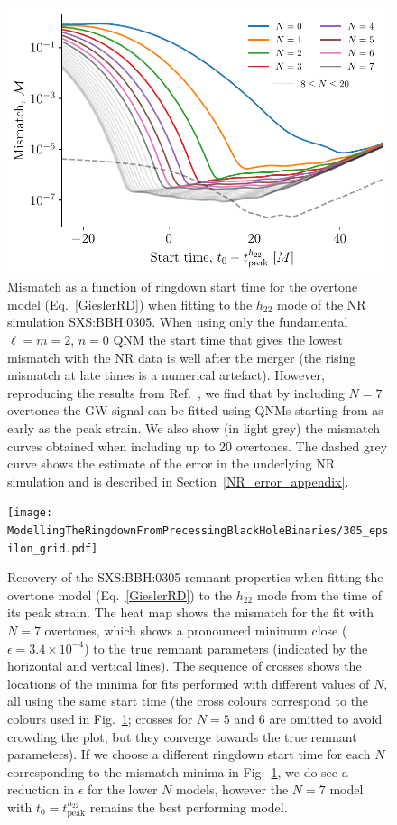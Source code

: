 \begin{figure}[t]
    \centering
    \includegraphics[width=0.6\columnwidth]{Figures/ModellingTheRingdownFromPrecessingBlackHoleBinaries/305_mismatch_vs_t0_updated.pdf}
    \caption[Mismatch of the overtone model fitted to SXS:BBH:0305]{ 
    Mismatch as a function of ringdown start time for the overtone model (Eq.~\ref{GieslerRD}) when fitting to the $h_{22}$ mode of the NR simulation SXS:BBH:0305. 
    When using only the fundamental $\ell = m = 2$, $n = 0$ QNM the start time that gives the lowest mismatch with the NR data is well after the merger (the rising mismatch at late times is a numerical artefact). 
    However, reproducing the results from Ref.~\cite{Giesler:2019uxc}, we find that by including $N=7$ overtones the GW signal can be fitted using QNMs starting from as early as the peak strain. 
    We also show (in light grey) the mismatch curves obtained when including up to 20 overtones.
    The dashed grey curve shows the estimate of the error in the underlying NR simulation and is described in Section~\ref{NR_error_appendix}.
    }
    \label{305_mismatch_vs_t0}
\end{figure}

\begin{figure}[t]
    \centering
    \texttt{[image: ModellingTheRingdownFromPrecessingBlackHoleBinaries/305\_epsilon\_grid.pdf]}
    \caption[Recovery of SXS:BBH:0305 remnant properties using the overtone model]{ 
    Recovery of the SXS:BBH:0305 remnant properties when fitting the overtone model (Eq.~\ref{GieslerRD}) to the $h_{22}$ mode from the time of its peak strain.
    The heat map shows the mismatch for the fit with $N=7$ overtones, which shows a pronounced minimum close ($\epsilon=3.4\times 10^{-4}$) to the true remnant parameters (indicated by the horizontal and vertical lines).
    The sequence of crosses shows the locations of the minima for fits performed with different values of $N$, all using the same start time (the cross colours correspond to the colours used in Fig.~\ref{305_mismatch_vs_t0}; crosses for $N=5$ and 6 are omitted to avoid crowding the plot, but they converge towards the true remnant parameters). 
    If we choose a different ringdown start time for each $N$ corresponding to the mismatch minima in Fig.~\ref{305_mismatch_vs_t0}, we do see a reduction in $\epsilon$ for the lower $N$ models, however the $N=7$ model with $t_0=t_\mathrm{peak}^{h_{22}}$ remains the best performing model.
    } 
    \label{305_epsilon_grid}
\end{figure}

